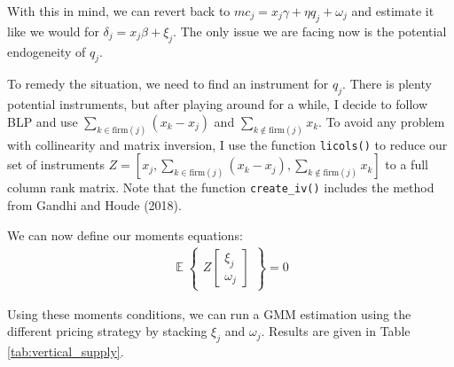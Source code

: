\documentclass[12pt]{article}
\newcommand{\1}{{\bf 1}} %
\DeclareMathOperator{\E}{\mathbb{E}} %
\newcommand{\Ex}[1]{\E\left\{#1\right\}} %
\newcommand{\bra}[1]{\left[#1\right]}
\newcommand{\mat}[1]{\begin{matrix}#1\end{matrix}}
\newcommand{\bmat}[1]{\bra{\mat{#1}}}
\begin{document}
With this in mind, we can revert back to $mc_j = x_j\gamma +\eta q_j +\omega_j$ and estimate it like we would for $\delta_j = x_j\beta +\xi_j$. The only issue we are facing now is	the potential endogeneity of $q_j$.

To remedy the situation, we need to find an instrument for $q_j$. There is plenty potential instruments, but after playing around for a while, I decide to follow BLP and use $\sum_{k\in \text{firm}(j)}  (x_k-x_j)$ and $\sum_{k\not\in \text{firm}(j)} x_k$. To avoid any problem with collinearity and matrix inversion, I use the function \verb!licols()! to reduce our set of instruments $Z = [x_j,\sum_{k\in \text{firm}(j)}  (x_k-x_j), \sum_{k\not\in \text{firm}(j)} x_k]$ to a full column rank matrix. Note that the function \verb!create_iv()! includes the method from Gandhi and Houde (2018).

We can now define our moments equations:
\begin{align*}
	\Ex{\mat{Z \bmat{\xi_j \\ \omega_j}}} = 0
\end{align*}

Using these moments conditions, we can run a GMM estimation using the different pricing strategy by stacking $\xi_j$ and $\omega_j$. Results are given in Table \ref{tab:vertical_supply}.
\end{document}
